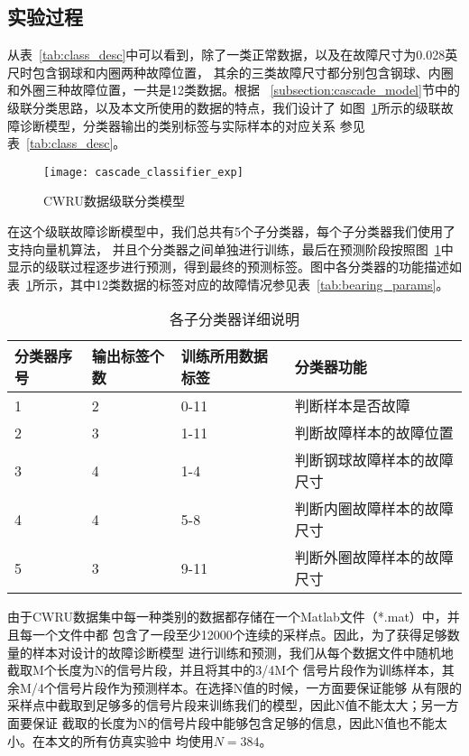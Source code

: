 \subsection{实验过程}

从表~\ref{tab:class_desc}中可以看到，除了一类正常数据，以及在故障尺寸为0.028英尺时包含钢球和内圈两种故障位置，
其余的三类故障尺寸都分别包含钢球、内圈和外圈三种故障位置，一共是12类数据。根据
~\ref{subsection:cascade_model}节中的级联分类思路，以及本文所使用的数据的特点，我们设计了
如图~\ref{fig:cascade_classifier_exp}所示的级联故障诊断模型，分类器输出的类别标签与实际样本的对应关系
参见表~\ref{tab:class_desc}。
\begin{figure}[ht] %
  \centering
  \texttt{[image: cascade\_classifier\_exp]}
  \caption{CWRU数据级联分类模型}
  \label{fig:cascade_classifier_exp}
\end{figure}

在这个级联故障诊断模型中，我们总共有5个子分类器，每个子分类器我们使用了支持向量机算法，
并且个分类器之间单独进行训练，最后在预测阶段按照图~\ref{fig:cascade_classifier_exp}中
显示的级联过程逐步进行预测，得到最终的预测标签。图中各分类器的功能描述如
表~\ref{tab:classifier_desc}所示，其中12类数据的标签对应的故障情况参见表~\ref{tab:bearing_params}。
\begin{table}[htb]
  \centering
  \begin{minipage}[t]{0.8\linewidth} %
  \caption{各子分类器详细说明}
  \label{tab:classifier_desc}
    \begin{tabularx}{\linewidth}{lXXX}
      \toprule[1.5pt]
      分类器序号 & 输出标签个数 & 训练所用数据标签 & 分类器功能 \\\midrule[1pt]
      1 & 2 & 0-11 & 判断样本是否故障\\
      2 & 3 & 1-11 & 判断故障样本的故障位置\\
      3 & 4 & 1-4 & 判断钢球故障样本的故障尺寸\\
      4 & 4 & 5-8 & 判断内圈故障样本的故障尺寸\\
      5 & 3 & 9-11 & 判断外圈故障样本的故障尺寸\\
      \bottomrule[1.5pt]
    \end{tabularx}
  \end{minipage}
\end{table}

由于CWRU数据集中每一种类别的数据都存储在一个Matlab文件（*.mat）中，并且每一个文件中都
包含了一段至少12000个连续的采样点。因此，为了获得足够数量的样本对设计的故障诊断模型
进行训练和预测，我们从每个数据文件中随机地截取M个长度为N的信号片段，并且将其中的3/4M个
信号片段作为训练样本，其余M/4个信号片段作为预测样本。在选择N值的时候，一方面要保证能够
从有限的采样点中截取到足够多的信号片段来训练我们的模型，因此N值不能太大；另一方面要保证
截取的长度为N的信号片段中能够包含足够的信息，因此N值也不能太小。在本文的所有仿真实验中
均使用$N=384$。

